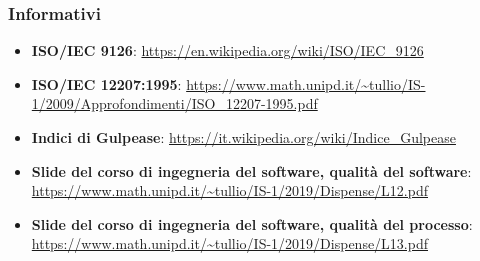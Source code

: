 \subsubsection{Informativi}
\begin{itemize}
	\item \textbf {ISO/IEC 9126}:
	\url {https://en.wikipedia.org/wiki/ISO/IEC_9126}
	\item \textbf{ISO/IEC 12207:1995}:
	\url{https://www.math.unipd.it/~tullio/IS-1/2009/Approfondimenti/ISO_12207-1995.pdf}
	\item \textbf {Indici di Gulpease}:
	\url{https://it.wikipedia.org/wiki/Indice_Gulpease}
	\item \textbf {Slide del corso di ingegneria del software, qualità del software}:
	\url{https://www.math.unipd.it/~tullio/IS-1/2019/Dispense/L12.pdf}
	\item \textbf {Slide del corso di ingegneria del software, qualità del processo}:
	\url{https://www.math.unipd.it/~tullio/IS-1/2019/Dispense/L13.pdf}
\end{itemize}